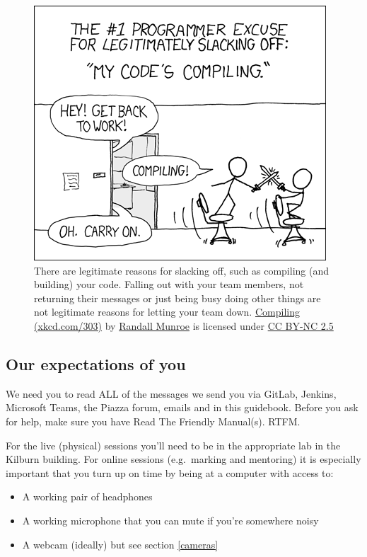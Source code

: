 \documentclass[
]{book}
\providecommand{\tightlist}{%
  \setlength{\itemsep}{0pt}\setlength{\parskip}{0pt}}
\begin{document}
\begin{figure}

{\centering \includegraphics[width=0.75\linewidth]{images/compiling} 

}

\caption{There are legitimate reasons for slacking off, such as compiling (and building) your code. Falling out with your team members, not returning their messages or just being busy doing other things are not legitimate reasons for letting your team down. \href{https://xkcd.com/303/}{Compiling (xkcd.com/303)} by \href{https://en.wikipedia.org/wiki/Randall_Munroe}{Randall Munroe} is licensed under \href{https://creativecommons.org/licenses/by-nc/2.5/}{CC BY-NC 2.5}}\label{fig:xkcd-compiling-fig}
\end{figure}



\hypertarget{rtfm}{%
\subsection{Our expectations of you}\label{rtfm}}

We need you to read ALL of the messages we send you via GitLab, Jenkins, Microsoft Teams, the Piazza forum, emails and in this guidebook. Before you ask for help, make sure you have Read The Friendly Manual(s). RTFM.

For the live (physical) sessions you'll need to be in the appropriate lab in the Kilburn building. For online sessions (e.g.~marking and mentoring) it is especially important that you turn up on time by being at a computer with access to:

\begin{itemize}
\tightlist
\item
  A working pair of headphones
\item
  A working microphone that you can mute if you're somewhere noisy
\item
  A webcam (ideally) but see section \ref{cameras}
\end{itemize}
\end{document}
